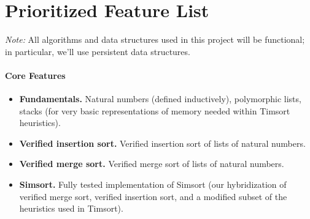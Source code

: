 \documentclass{article}
\begin{document}
\section{Prioritized Feature List}
\emph{Note:} All algorithms and data structures used in this project will
be functional; in particular, we'll use persistent data structures.

\paragraph{Core Features}
\begin{itemize}
  \item \textbf{Fundamentals.}
    Natural numbers (defined inductively), polymorphic lists,
    stacks (for very basic representations of memory needed within Timsort
    heuristics).
  \item \textbf{Verified insertion sort.}
    Verified insertion sort of lists of natural numbers.
  \item \textbf{Verified merge sort.}
    Verified merge sort of lists of natural numbers.
  \item \textbf{Simsort.}
    Fully tested implementation of Simsort (our hybridization of verified
    merge sort, verified insertion sort, and a modified subset of the
    heuristics used in Timsort).

\end{itemize}
\end{document}
